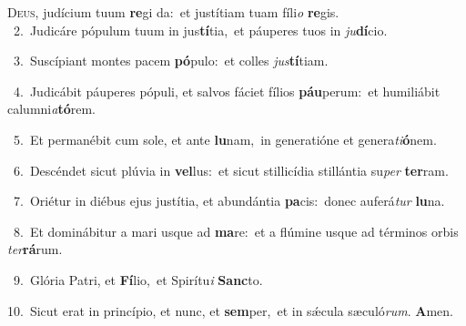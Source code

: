 \lettrine{\initial\textcolor{\initialcolor}{D}}{eus,} judícium tuum \textbf{re}\-gi da:~\star et justítiam tuam fíli\textit{o} \textbf{re}\-gis.\\
{\numbfont\textcolor{\numbcolor}{~2.}}~Judicáre pópulum tuum in jus\-\textbf{tí}\-tia,~\star et páuperes tuos in \textit{ju}\-\textbf{dí}cio.\par
{\numbfont\textcolor{\numbcolor}{~3.}}~Suscípiant montes pacem \textbf{pó}\-pulo:~\star et colles \textit{jus}\-\textbf{tí}tiam.\par
{\numbfont\textcolor{\numbcolor}{~4.}}~Judicábit páuperes pópuli, et salvos fáciet fílios \textbf{páu}\-perum:~\star et humiliábit calumni\-\textit{a}\-\textbf{tó}rem.\par
{\numbfont\textcolor{\numbcolor}{~5.}}~Et permanébit cum sole, et ante \textbf{lu}\-nam,~\star in generatióne et genera\-\textit{ti}\-\textbf{ó}nem.\par
{\numbfont\textcolor{\numbcolor}{~6.}}~Descéndet sicut plúvia in \textbf{vel}\-lus:~\star et sicut stillicídia stillántia su\textit{per} \textbf{ter}\-ram.\par
{\numbfont\textcolor{\numbcolor}{~7.}}~Oriétur in diébus ejus justítia, et abundántia \textbf{pa}\-cis:~\star donec auferá\textit{tur} \textbf{lu}\-na.\par
{\numbfont\textcolor{\numbcolor}{~8.}}~Et dominábitur a mari usque ad \textbf{ma}\-re:~\star et a flúmine usque ad términos orbis \textit{ter}\-\textbf{rá}rum.\par
{\numbfont\textcolor{\numbcolor}{~9.}}~Glória Patri, et \textbf{Fí}\-lio,~\star et Spirítu\textit{i} \textbf{Sanc}\-to.\par
{\numbfont\textcolor{\numbcolor}{10.}}~Sicut erat in princípio, et nunc, et \textbf{sem}\-per,~\star et in sǽcula sæculó\-\textit{rum}\-. \textbf{A}\-men.\par
